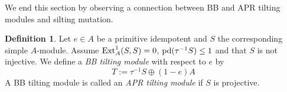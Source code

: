 \documentclass[a4paper,reqno]{amsart}
\theoremstyle{definition}
\newtheorem{definition}[theorem]{Definition}
\newcommand{\proj}[1]{{\rm{proj}}\text{-}#1} %
\begin{document}


We end this section by observing a connection between BB and APR tilting modules and silting mutation.

\begin{definition}\label{def:APR and BB}
Let $e\in A$ be a primitive idempotent and $S$ the corresponding simple $A$-module.
Assume ${\rm{Ext}}_{A}^{1}(S, S)=0$, ${\rm{pd}}(\tau^{-1}S)\leq 1$ and that $S$ is not injective.
We define a \emph{BB tilting module} \cite{BB} with respect to $e$ by
\[T:=\tau^{-1}S\oplus (1-e)A\] 
A BB tilting module is called an \emph{APR tilting module} \cite{APR} if $S$ is projective. 
\end{definition}

%

\end{document}
